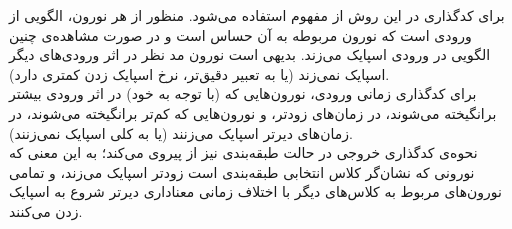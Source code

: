 \documentclass[a4paper]{article}
\begin{document}
برای کدگذاری در این روش از مفهوم  
 استفاده می‌شود. منظور از 
  هر نورون، الگویی از ورودی است که نورون مربوطه به آن حساس است و در صورت مشاهده‌ی چنین الگویی در ورودی اسپایک می‌زند. بدیهی است نورون مد نظر در اثر ورودی‌های دیگر اسپایک نمی‌زند (یا به تعبیر دقیق‌تر، نرخ اسپایک زدن کمتری دارد).\\
  برای کدگذاری زمانی ورودی، نورون‌هایی که (با توجه به  خود) در اثر ورودی بیشتر برانگیخته می‌شوند، در زمان‌های زودتر، و نورون‌هایی که کم‌تر برانگیخته می‌شوند، در زمان‌های دیرتر اسپایک می‌زنند (یا به کلی اسپایک نمی‌زنند).\\
  
  نحوه‌ی کدگذاری خروجی در حالت طبقه‌بندی نیز از 
   پیروی می‌کند؛ به این معنی که نورونی که نشان‌گر کلاس انتخابی طبقه‌بندی است زودتر اسپایک می‌زند، و تمامی نورون‌های مربوط به کلاس‌های دیگر با اختلاف زمانی معناداری دیرتر شروع به اسپایک زدن می‌کنند.
\end{document}
